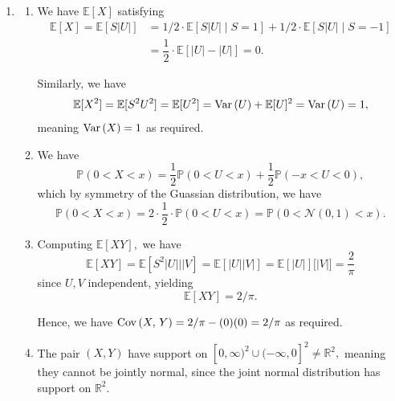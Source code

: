 \documentclass[12pt]{article}
\begin{document}
\begin{enumerate}
\begin{enumerate}
      \item Write $X, Y \sim$ Bernoulli(1/2) be independent, with $M
        = \max(X, Y)$ and $m = \min(X, Y),$ yielding $\Cov{M}{m} =
        1/16 \neq 0 = \Cov{X}{Y}.$ Thus, this is a counterexample.

    \end{enumerate}

  \item
    \begin{enumerate}
      \item We have $\mathbb E[X]$ satisfying
        \begin{align*}
          \mathbb E[X] = \mathbb E[S|U|] &= 1/2  \cdot \mathbb E[S|U|
          \mid S = 1] + 1/2 \cdot \mathbb E[S|U| \mid S = -1] \\
          &=\dfrac{1}{2} \cdot \mathbb E[|U| - |U|] = 0.
        \end{align*}

        Similarly, we have $$\mathbb E[X^2] = \mathbb E[S^2 U^2] =
        \mathbb E[U^2] = \operatorname{Var}\left(U\right) + \mathbb E[U]^2 = \operatorname{Var}\left(U\right) = 1,$$
        meaning $\operatorname{Var}\left(X\right) = 1$ as required.

      \item We have $$
        \mathbb P(0 < X < x) = \dfrac{1}{2} \mathbb P(0 < U <x) +
        \dfrac{1}{2} \mathbb P(-x < U< 0),
        $$
        which by symmetry of the Guassian distribution, we have
        $$
        \mathbb P(0 < X< x) = 2 \cdot \dfrac{1}{2} \cdot \mathbb P(0
        < U < x) = \mathbb P(0 < \mathcal N(0, 1)  < x).
        $$

      \item Computing $\mathbb E[XY],$ we have
        $$
        \mathbb E[XY] = \mathbb E[S^2 |U|||V] = \mathbb E[|U||V|] =
        \mathbb E[|U|] \mathbb [|V|] = \dfrac{2}{\pi}
        $$
        since $U, V$ independent, yielding
        $$
        \mathbb E[XY] = 2/\pi.
        $$

        Hence, we have $\operatorname{Cov}\left(X,\,Y\right) = 2/\pi - (0)(0) = 2/\pi$ as required.

      \item The pair $(X, Y)$ have support on $[0, \infty)^2 \cup
        (-\infty, 0]^2 \neq \mathbb R^2,$ meaning they cannot be
        jointly normal, since the joint normal distribution has
        support on $\mathbb R^2.$
    \end{enumerate}
\end{enumerate}
\end{document}
